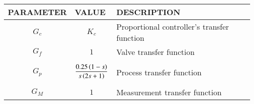 \begin{tabular}{|p{2cm}|p{2cm}|p{3.8cm}|}
    \hline
    PARAMETER & VALUE  & DESCRIPTION \\ \hline
    $$G_c$$ & $$K_c$$ & Proportional controller's transfer function \\ \hline
    $$G_f$$ & $$1$$ & Valve transfer function \\ \hline
    $$G_p$$ & $$\frac{0.25\left(1-s\right)}{s\left(2s+1\right)}$$ & Process transfer function   \\ \hline
    $$G_M$$ & $$1$$ & Measurement transfer function \\ \hline 
\end{tabular}
